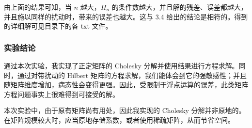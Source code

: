 \documentclass[11pt]{ctexart}
\begin{document}
    由上面的结果可知，当 \(n\) 越大，\(H_n\)
的条件数越大，并且解的残差、误差都越大，并且施以同样的扰动时，带来的误差也越大。这与
3.4 给出的结论是相符的。得到的详细解可见目录下的各 txt 文件。

    \subsubsection{实验结论}\label{ux5b9eux9a8cux7ed3ux8bba}

通过本次实验，我实现了正定矩阵的 Cholesky
分解并使用结果进行方程求解。同时，通过对带扰动的 Hilbert
矩阵的方程求解，我们能体会到它的强敏感性；并且随矩阵维度增加，病态性会变得更强。因此，受限制于浮点运算的误差，此类矩阵方程问题事实上很难得到可接受的解。

本次实验中，由于原有矩阵尚有用处，因此我实现的 Cholesky
分解并非原地的。在矩阵规模较大时，应当原地存储系数，或者使用稀疏矩阵，从而节省空间。


    
    
    
    
\end{document}
